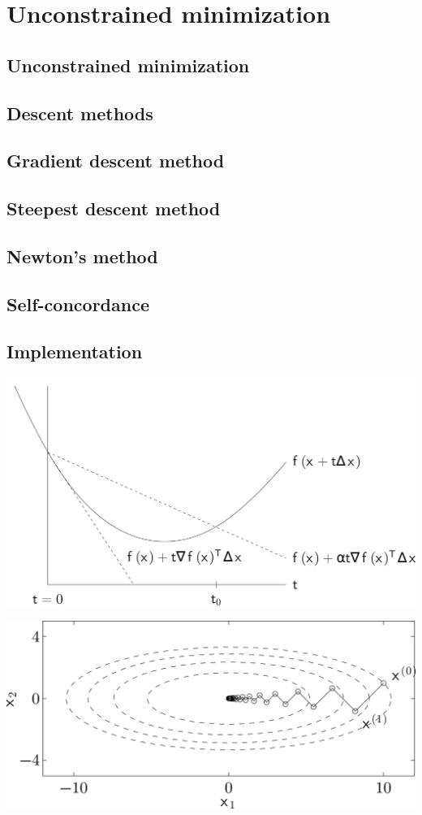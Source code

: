 \chapter{Unconstrained minimization}

\clearpage
\section{Unconstrained minimization}

\clearpage
\section{Descent methods}

\clearpage
\section{Gradient descent method}

\clearpage
\section{Steepest descent method}

\clearpage
\section{Newton’s method}

\clearpage
\section{Self-concordance}

\clearpage
\section{Implementation}


\clearpage
\hfil\includegraphics[width=.5\textwidth]{../Graphics/465.png}\hfil

\clearpage
\hfil\includegraphics[width=.5\textwidth]{../Graphics/469.png}\hfil

